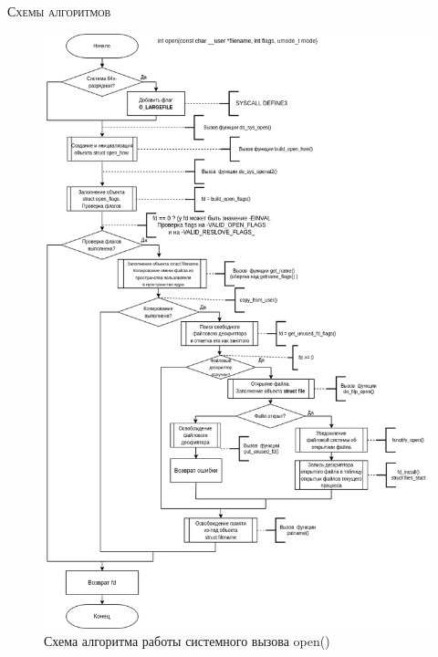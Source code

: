 \textsc{\huge Схемы алгоритмов} \\
\begin{figure}[H]
	\centering
	\includegraphics[scale=0.5]{assets/open-open.drawio.png}
	\caption{Схема алгоритма работы системного вызова open()}
\end{figure}

